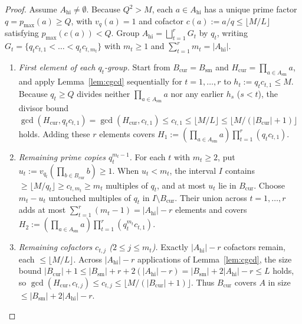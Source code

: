 \documentclass[11pt]{article}
\theoremstyle{remark}
\begin{document}
\begin{proof}
Assume $A_{\mathrm{hi}} \neq \emptyset$. Because $Q^2 > M$, each $a \in A_{\mathrm{hi}}$ has a unique prime factor $q = p_{\max}(a) \ge Q$, with $v_q(a) = 1$ and cofactor $c(a) := a / q \le \lfloor M / L \rfloor$ satisfying $p_{\max}(c(a)) < Q$. Group $A_{\mathrm{hi}} = \bigsqcup_{t = 1}^r G_t$ by $q_t$, writing $G_t = \{q_t c_{t, 1} < \dots < q_t c_{t, m_t}\}$ with $m_t \ge 1$ and $\sum_{t = 1}^r m_t = |A_{\mathrm{hi}}|$.
\begin{enumerate}
\item \emph{First element of each $q_t$-group.} Start from $B_{\mathrm{cur}} = B_{\mathrm{sm}}$ and $H_{\mathrm{cur}} = \prod_{a \in A_{\mathrm{sm}}} a$, and apply Lemma~\ref{lem:cgcd} sequentially for $t = 1, \dots, r$ to $h_t := q_t c_{t, 1} \le M$. Because $q_t \ge Q$ divides neither $\prod_{a \in A_{\mathrm{sm}}} a$ nor any earlier $h_s$ ($s < t$), the divisor bound $\gcd(H_{\mathrm{cur}}, q_t c_{t, 1}) = \gcd(H_{\mathrm{cur}}, c_{t, 1}) \le c_{t, 1} \le \lfloor M / L \rfloor \le \lfloor M / (|B_{\mathrm{cur}}| + 1) \rfloor$ holds. Adding these $r$ elements covers $H_1 := (\prod_{a \in A_{\mathrm{sm}}} a) \prod_{t = 1}^r (q_t c_{t, 1})$.
\item \emph{Remaining prime copies $q_t^{m_t - 1}$.} For each $t$ with $m_t \ge 2$, put $u_t := v_{q_t}(\prod_{b \in B_{\mathrm{cur}}} b) \ge 1$. When $u_t < m_t$, the interval $I$ contains $\ge \lfloor M / q_t \rfloor \ge c_{t, m_t} \ge m_t$ multiples of $q_t$, and at most $u_t$ lie in $B_{\mathrm{cur}}$. Choose $m_t - u_t$ untouched multiples of $q_t$ in $I \setminus B_{\mathrm{cur}}$. Their union across $t = 1, \dots, r$ adds at most $\sum_{t = 1}^r (m_t - 1) = |A_{\mathrm{hi}}| - r$ elements and covers $H_2 := (\prod_{a \in A_{\mathrm{sm}}} a) \prod_{t = 1}^r (q_t^{m_t} c_{t, 1})$.
\item \emph{Remaining cofactors $c_{t, j}$ ($2 \le j \le m_t$).} Exactly $|A_{\mathrm{hi}}| - r$ cofactors remain, each $\le \lfloor M / L \rfloor$. Across $|A_{\mathrm{hi}}| - r$ applications of Lemma~\ref{lem:cgcd}, the size bound $|B_{\mathrm{cur}}| + 1 \le |B_{\mathrm{sm}}| + r + 2 (|A_{\mathrm{hi}}| - r) = |B_{\mathrm{sm}}| + 2 |A_{\mathrm{hi}}| - r \le L$ holds, so $\gcd(H_{\mathrm{cur}}, c_{t, j}) \le c_{t, j} \le \lfloor M / (|B_{\mathrm{cur}}| + 1) \rfloor$. Thus $B_{\mathrm{cur}}$ covers $A$ in size $\le |B_{\mathrm{sm}}| + 2 |A_{\mathrm{hi}}| - r$. \qedhere
\end{enumerate}
\end{proof}
\end{document}

